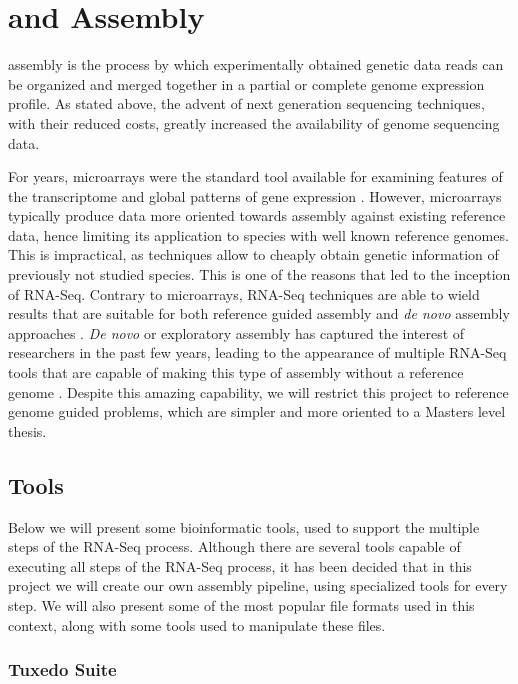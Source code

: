 \section{\rnaseq{} and \Trans{} Assembly}\label{sec:assembly}

\Trans{} assembly is the process by which experimentally obtained genetic data
reads can be organized and merged together in a partial or complete genome
expression profile. As stated above, the advent of next generation sequencing
techniques, with their reduced costs, greatly increased the availability of
genome sequencing data.

For years, microarrays were the standard tool available for examining features
of the transcriptome and global patterns of gene expression \cite{Wolf2013}.
However, microarrays typically produce data more oriented towards assembly
against existing reference data, hence limiting its application to species with
well known reference genomes. This is impractical, as \ngs{} techniques allow to
cheaply obtain genetic information of previously not studied species. This is
one of the reasons that led to the inception of RNA-Seq. Contrary to
microarrays, RNA-Seq techniques are able to wield results that are suitable for
both reference guided assembly and \textit{de novo} assembly approaches
\cite{Wilhelm2009}. \textit{De novo} or exploratory assembly has captured the
interest of researchers in the past few years, leading to the appearance of
multiple RNA-Seq tools that are capable of making this type of assembly without
a reference genome \cite{nuno11:assemblathon}. Despite this amazing capability,
we will restrict this project to reference genome guided problems, which are
simpler and more oriented to a Masters level thesis.

\subsection{\rnaseq{} Tools}\label{sec:seqtools}

Below we will present some bioinformatic tools, used to support the multiple
steps of the RNA-Seq process. Although there are several tools capable of
executing all steps of the RNA-Seq process, it has been decided that in this
project we will create our own assembly pipeline, using specialized tools for
every step. We will also present some of the most popular file formats used in
this context, along with some tools used to manipulate these files.

\subsubsection{Tuxedo Suite}

